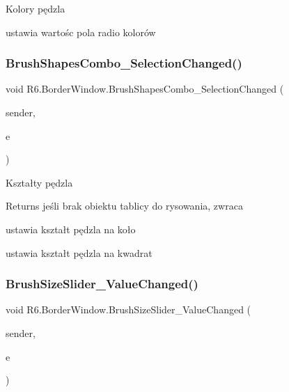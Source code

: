 Kolory pędzla 

ustawia wartośc pola radio kolorów \mbox{\label{class_r6_1_1_border_window_a9124fe60aaacd20c7c0d1ace0555a28b}} 
\subsubsection{\texorpdfstring{BrushShapesCombo\_SelectionChanged()}{BrushShapesCombo\_SelectionChanged()}}
{\footnotesize\ttfamily void R6.\+Border\+Window.\+Brush\+Shapes\+Combo\+\_\+\+Selection\+Changed (\begin{DoxyParamCaption}\item[{object}]{sender,  }\item[{Selection\+Changed\+Event\+Args}]{e }\end{DoxyParamCaption})\hspace{0.3cm}{\ttfamily [private]}}



Kształty pędzla 

\begin{DoxyReturn}{Returns}
jeśli brak obiektu tablicy do rysowania, zwraca 
\end{DoxyReturn}


ustawia kształt pędzla na koło 

ustawia kształt pędzla na kwadrat \mbox{\label{class_r6_1_1_border_window_ac61bc05781f6a6d8b6167e102c43f730}} 
\subsubsection{\texorpdfstring{BrushSizeSlider\_ValueChanged()}{BrushSizeSlider\_ValueChanged()}}
{\footnotesize\ttfamily void R6.\+Border\+Window.\+Brush\+Size\+Slider\+\_\+\+Value\+Changed (\begin{DoxyParamCaption}\item[{object}]{sender,  }\item[{Routed\+Property\+Changed\+Event\+Args$<$ double $>$}]{e }\end{DoxyParamCaption})\hspace{0.3cm}{\ttfamily [private]}}



